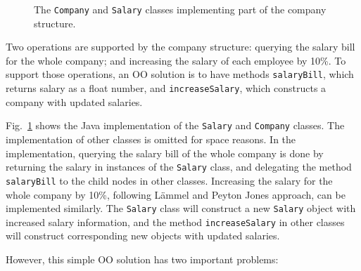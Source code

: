 \begin{figure}[t]
\nocaptionrule
\caption{The \lstinline{Company} and \lstinline{Salary} classes
  implementing part of the company structure.}
\label{oop_company}
\end{figure}

Two operations are supported by the company structure: querying the
salary bill for the whole company; and increasing the salary of each
employee by 10\%. To support those operations, an OO solution is to
have methods \lstinline{salaryBill}, which returns salary as a float
number, and \lstinline{increaseSalary}, which constructs a company
with updated salaries.

Fig.~\ref{oop_company} shows the Java implementation of the
\lstinline{Salary} and \lstinline{Company} classes. The implementation
of other classes is omitted for space reasons.  In the
implementation, querying the salary bill of the whole company is done
by returning the salary in instances of the \lstinline{Salary} class,
and delegating the method \lstinline{salaryBill} to the child nodes in
other classes. Increasing the salary for the whole company by 10\%,
following L\"ammel and Peyton Jones approach, can be implemented
similarly. The \lstinline{Salary} class will construct a new
\lstinline{Salary} object with increased salary information, and
the method \lstinline{increaseSalary} in other classes will
construct corresponding new objects with updated salaries.

However, this simple OO solution has two important problems:

